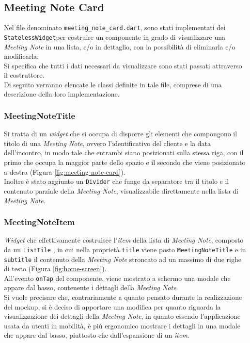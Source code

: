 \subsection{Meeting Note Card}
\label{subsec:meeting-note-card}

Nel file denominato \lstinline{meeting_note_card.dart}, sono stati implementati dei \lstinline{StatelessWidget}per costruire un componente in grado di visualizzare una \emph{Meeting Note} in una lista, e/o in dettaglio, con la possibilità di eliminarla e/o modificarla. \\
Si specifica che tutti i dati necessari da visualizzare sono stati passati attraverso il costruttore. \\
Di seguito verranno elencate le classi definite in tale file, comprese di una descrizione della loro implementazione.

\subsubsection*{MeetingNoteTitle}
\label{subsubsec:meeting-note-title}

Si tratta di un \emph{widget} che si occupa di disporre gli elementi che compongono il titolo di una 
\emph{Meeting Note}, ovvero l'identificativo del cliente e la data dell'incontro, in modo tale che entrambi siano posizionati sulla stessa riga, con il primo che occupa la maggior parte dello spazio e il secondo che viene posizionato a destra (Figura \ref{fig:meeting-note-card}).\\
Inoltre è stato aggiunto un \lstinline{Divider} \cite{site:divider} che funge da separatore tra il titolo e il contenuto parziale della \emph{Meeting Note}, visualizzabile direttamente nella lista di \emph{Meeting Note}.

\subsubsection*{MeetingNoteItem}
\label{subsubsec:meeting-note-item}

\emph{Widget} che effettivamente costruisce l'\emph{item} della lista di \emph{Meeting Note}, composto da un \lstinline{ListTile} \cite{site:list-tile}, in cui nella proprietà \lstinline{title} viene posto \lstinline{MeetingNoteTitle} e in \lstinline{subtitle} il contenuto della \emph{Meeting Note} stroncato ad un massimo di due righe di testo (Figura \ref{fig:home-screen}).\\
All'evento \lstinline{onTap} del componente, viene mostrato a schermo una modale che appare dal basso, contenente i dettagli della \emph{Meeting Note}.\\
Si vuole precisare che, contrariamente a quanto pensato durante la realizzazione del \gls{mockup}\glsoccur, si è deciso di apportare una modifica per quanto riguarda la visualizzazione dei dettagli della \emph{Meeting Note}, in quanto essendo l'applicazione usata da utenti in mobilità, è più ergonomico mostrare i dettagli in una modale che appare dal basso, piuttosto che dall'espansione di un \emph{item}.

